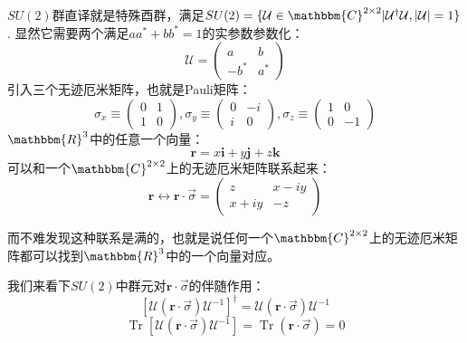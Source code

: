 $SU(2)$群直译就是特殊酉群，满足$SU(2)=\{\mathcal{U}\in\mathbbm{C}^{2\times 2}|\mathcal{U}^\dagger \mathcal{U},|\mathcal{U}|=1\}$. 显然它需要两个满足$aa^*+bb^*=1$的实参数参数化：
\[\mathcal{U}=\left( {\begin{array}{*{20}{c}}
		a&b \\ 
		{ - {b^*}}&{{a^*}} 
\end{array}} \right)\]
引入三个无迹厄米矩阵，也就是Pauli矩阵：
\begin{equation}
		\sigma_x\equiv\begin{pmatrix}
			0&1\\
			1&0
		\end{pmatrix},
		\sigma_y\equiv\begin{pmatrix}
			0&-i\\
			i&0
		\end{pmatrix},
		\sigma_z\equiv\begin{pmatrix}
			1&0\\
			0&-1
		\end{pmatrix}
\end{equation}
$\mathbbm{R}^3$中的任意一个向量：
\[\mathbf{r}=x\mathbf{i}+y\mathbf{j}+z\mathbf{k}\]
可以和一个$\mathbbm{C}^{2\times 2}$上的无迹厄米矩阵联系起来：
\[\mathbf{r}\leftrightarrow\mathbf{r}\cdot\vec{\sigma}=\left( {\begin{array}{*{20}{c}}
		z&{x - iy} \\ 
		{x + iy}&{ - z} 
\end{array}} \right)\]

而不难发现这种联系是满的，也就是说任何一个$\mathbbm{C}^{2\times 2}$上的无迹厄米矩阵都可以找到$\mathbbm{R}^3$中的一个向量对应。

我们来看下$SU(2)$中群元对$\mathbf{r}\cdot\vec{\sigma}$的伴随作用：
\[\left[\mathcal{U}(\mathbf{r}\cdot\vec{\sigma})\mathcal{U}^{-1}\right]^\dagger=\mathcal{U}(\mathbf{r}\cdot\vec{\sigma})\mathcal{U}^{-1}\]
\[\operatorname{Tr}\left[\mathcal{U}(\mathbf{r}\cdot\vec{\sigma})\mathcal{U}^{-1}\right]=\operatorname{Tr}(\mathbf{r}\cdot\vec{\sigma})=0\]

